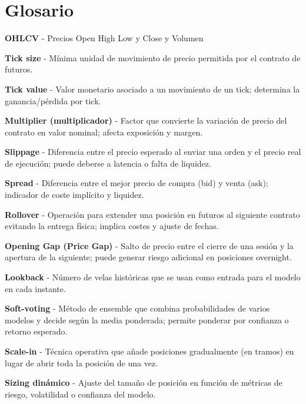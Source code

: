 \setlength{\parindent}{0em}


\section*{Glosario}

\textbf{OHLCV} - Precios Open High Low y Close y Volumen

\textbf{Tick size} - Mínima unidad de movimiento de precio permitida por el contrato de futuros.

\textbf{Tick value} - Valor monetario asociado a un movimiento de un tick; determina la ganancia/pérdida por tick.

\textbf{Multiplier (multiplicador)} - Factor que convierte la variación de precio del contrato en valor nominal; afecta exposición y margen.

\textbf{Slippage} - Diferencia entre el precio esperado al enviar una orden y el precio real de ejecución; puede deberse a latencia o falta de liquidez.

\textbf{Spread} - Diferencia entre el mejor precio de compra (bid) y venta (ask); indicador de coste implícito y liquidez.

\textbf{Rollover} - Operación para extender una posición en futuros al siguiente contrato evitando la entrega física; implica costes y ajuste de fechas.

\textbf{Opening Gap (Price Gap)} - Salto de precio entre el cierre de una sesión y la apertura de la siguiente; puede generar riesgo adicional en posiciones overnight.

\textbf{Lookback} - Número de velas históricas que se usan como entrada para el modelo en cada instante.

\textbf{Soft-voting} - Método de ensemble que combina probabilidades de varios modelos y decide según la media ponderada; permite ponderar por confianza o retorno esperado.

\textbf{Scale-in} - Técnica operativa que añade posiciones gradualmente (en tramos) en lugar de abrir toda la posición de una vez.

\textbf{Sizing dinámico} - Ajuste del tamaño de posición en función de métricas de riesgo, volatilidad o confianza del modelo.
